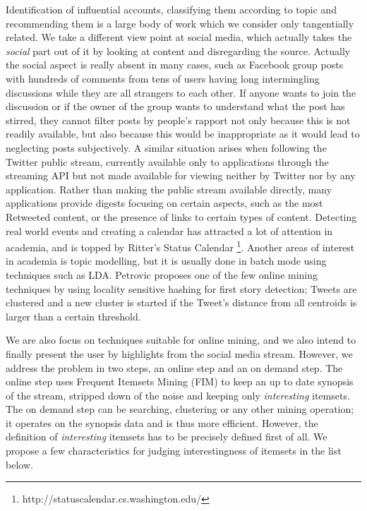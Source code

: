 \documentclass[11pt]{llncs} %
\begin{document}
Identification of influential accounts, classifying them according to topic and recommending them is a large body of work which we consider only tangentially related. We take a different view point at social media, which actually takes the \emph{social} part out of it by looking at content and disregarding the source. Actually the social aspect is really absent in many cases, such as Facebook group posts with hundreds of comments from tens of users having long intermingling discussions while they are all strangers to each other. If anyone wants to join the discussion or if the owner of the group wants to understand what the post has stirred, they cannot filter posts by people's rapport not only because this is not readily available, but also because this would be inappropriate as it would lead to neglecting posts subjectively. A similar situation arises when following the Twitter public stream, currently available only to applications through the streaming API but not made available for viewing neither by Twitter nor by any application. Rather than making the public stream available directly, many applications provide digests focusing on certain aspects, such as the most Retweeted content, or the presence of links to certain types of content. Detecting real world events and creating a calendar has attracted a lot of attention in academia, and is topped by Ritter's Status Calendar \footnote{http://statuscalendar.cs.washington.edu/}. Another areas of interest in academia is topic modelling, but it is usually done in batch mode using techniques such as LDA. Petrovic proposes one of the few online mining techniques by using locality sensitive hashing for first story detection; Tweets are clustered and a new cluster is started if the Tweet's distance from all centroids is larger than a certain threshold.

We are also focus on techniques suitable for online mining, and we also intend to finally present the user by highlights from the social media stream. However, we address the problem in two steps, an online step and an on demand step. The online step uses Frequent Itemsets Mining (FIM) to keep an up to date synopsis of the stream, stripped down of the noise and keeping only \emph{interesting} itemsets. The on demand step can be searching, clustering or any other mining operation; it operates on the synopsis data and is thus more efficient. However, the definition of \emph{interesting} itemsets has to be precisely defined first of all. We propose a few characteristics for judging interestingness of itemsets in the list below.
\end{document}
